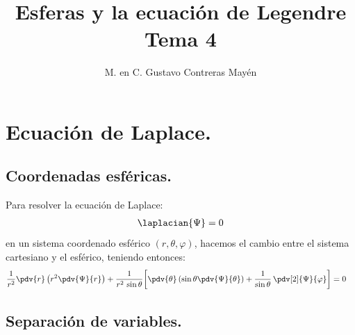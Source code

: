 

\title{Esferas y la ecuación de Legendre \\ {\large Tema 4}\vspace{-3ex}}
\author{M. en C. Gustavo Contreras Mayén}
\date{ }

\pagestyle{fancy}
\fancyhf{}
\lhead{\leftmark}
\rfoot{\thepage}
\setlength{\headheight}{16pt}%

\def\changemargin#1#2{\list{}{\rightmargin#2\leftmargin#1}\item[]}
\let\endchangemargin=\endlist 



\maketitle
\fontsize{14}{14}\selectfont
\tableofcontents
\newpage

\section{Ecuación de Laplace.}

\subsection{Coordenadas esféricas.}

Para resolver la ecuación de Laplace:
\begin{align*}
\laplacian{\Psi} = 0
\end{align*}
en un sistema coordenado esférico $(r, \theta, \varphi)$, hacemos el cambio entre el sistema cartesiano y el esférico, teniendo entonces:
\begin{align}
\begin{aligned}[b]
\dfrac{1}{r^{2}} \pdv{r} \left( r^{2} \pdv{\Psi}{r} \right) &+ \dfrac{1}{r^{2} \, \sin \theta} \bigg[ \pdv{\theta} \left( \sin \theta \pdv{\Psi}{\theta} \right) + \dfrac{1}{\sin \theta} \, \pdv[2]{\Psi}{\varphi} \bigg] = 0
\end{aligned}
\label{eq:ecuacion_22_15}
\end{align}

\subsection{Separación de variables.}

